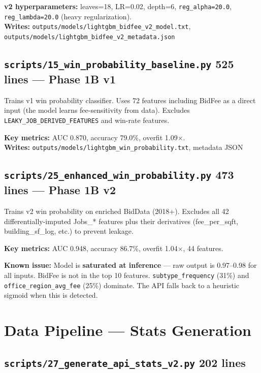 \documentclass[11pt,a4paper]{article}
\newcommand{\file}[1]{\texttt{\color{gssblue!70!black}#1}}
\newcommand{\pipetag}[1]{\colorbox{pipeblue!15}{\small\textcolor{pipeblue}{\textbf{#1}}}}
\begin{document}
\textbf{v2 hyperparameters:} leaves=18, LR=0.02, depth=6, \texttt{reg\_alpha=20.0}, \texttt{reg\_lambda=20.0} (heavy regularization).\\
\textbf{Writes:} \file{outputs/models/lightgbm\_bidfee\_v2\_model.txt}, \file{outputs/models/lightgbm\_bidfee\_v2\_metadata.json}

\subsection{\file{scripts/15\_win\_probability\_baseline.py} \pipetag{525 lines} --- Phase 1B v1}

Trains v1 win probability classifier. Uses 72 features including BidFee as a direct
input (the model learns fee-sensitivity from data). Excludes
\texttt{LEAKY\_JOB\_DERIVED\_FEATURES} and win-rate features.

\textbf{Key metrics:} AUC 0.870, accuracy 79.0\%, overfit 1.09$\times$.\\
\textbf{Writes:} \file{outputs/models/lightgbm\_win\_probability.txt}, metadata JSON

\subsection{\file{scripts/25\_enhanced\_win\_probability.py} \pipetag{473 lines} --- Phase 1B v2}

Trains v2 win probability on enriched BidData (2018+). Excludes all 42
differentially-imputed Jobs\_* features plus their derivatives (fee\_per\_sqft,
building\_sf\_log, etc.) to prevent leakage.

\textbf{Key metrics:} AUC 0.948, accuracy 86.7\%, overfit 1.04$\times$, 44 features.

\textbf{Known issue:} Model is \textbf{saturated at inference} --- raw output is
0.97--0.98 for all inputs. BidFee is not in the top 10 features.
\texttt{subtype\_frequency} (31\%) and \texttt{office\_region\_avg\_fee} (25\%) dominate.
The API falls back to a heuristic sigmoid when this is detected.

\section{Data Pipeline --- Stats Generation}
\label{sec:stats-gen}

\subsection{\file{scripts/27\_generate\_api\_stats\_v2.py} \pipetag{202 lines}}
\end{document}
